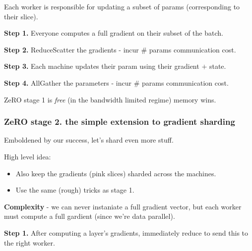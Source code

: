 \documentclass[12pt,twoside]{article}
\begin{document}
Each worker is responsible for updating a subset of params (corresponding to their slice).

\begin{center}
    \textbf{Step 1.} Everyone computes a full gradient on their subset of the batch.
\end{center}

\begin{center}
    \textbf{Step 2.} ReduceScatter the gradients - incur \# params communication cost.
\end{center}

\begin{center}
    \textbf{Step 3.} Each machine updates their param using their gradient \(+\) state.
\end{center}

\begin{center}
    \textbf{Step 4.} AllGather the parameters - incur \# params communication cost.
\end{center}

\begin{claim}
    ZeRO stage 1 is \textit{free} (in the bandwidth limited regime) memory wins.
\end{claim}

\subsubsection*{ZeRO stage 2. the simple extension to gradient sharding}

\begin{center}
    Emboldened by our success, let's shard even more stuff.
\end{center}

High level idea:
\begin{itemize}
    \item Also keep the gradients (pink slices) sharded across the machines.
    \item Use the same (rough) tricks as stage 1.
\end{itemize}

\textbf{Complexity} - we can never instaniate a full gradient vector, but each worker must compute a full gardient (since we're data parallel).

\begin{center}
    \textbf{Step 1.} After computing a layer's gradients, immediately reduce to send this to the right worker.
\end{center}
\end{document}
